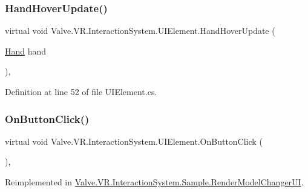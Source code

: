 \mbox{\label{class_valve_1_1_v_r_1_1_interaction_system_1_1_u_i_element_a025a3608cf51eb78b4db7db6f81b7bab}} 
\subsubsection{\texorpdfstring{HandHoverUpdate()}{HandHoverUpdate()}}
{\footnotesize\ttfamily virtual void Valve.\+V\+R.\+Interaction\+System.\+U\+I\+Element.\+Hand\+Hover\+Update (\begin{DoxyParamCaption}\item[{\mbox{\hyperlink{class_valve_1_1_v_r_1_1_interaction_system_1_1_hand}{Hand}}}]{hand }\end{DoxyParamCaption})\hspace{0.3cm}{\ttfamily [protected]}, {\ttfamily [virtual]}}



Definition at line 52 of file U\+I\+Element.\+cs.

\mbox{\label{class_valve_1_1_v_r_1_1_interaction_system_1_1_u_i_element_af4aa0f9d62309d5299ed208c524da1d1}} 
\subsubsection{\texorpdfstring{OnButtonClick()}{OnButtonClick()}}
{\footnotesize\ttfamily virtual void Valve.\+V\+R.\+Interaction\+System.\+U\+I\+Element.\+On\+Button\+Click (\begin{DoxyParamCaption}{ }\end{DoxyParamCaption})\hspace{0.3cm}{\ttfamily [protected]}, {\ttfamily [virtual]}}



Reimplemented in \mbox{\hyperlink{class_valve_1_1_v_r_1_1_interaction_system_1_1_sample_1_1_render_model_changer_u_i_a8b1eff8a1a58fca51ee9a963bff8b7f5}{Valve.\+V\+R.\+Interaction\+System.\+Sample.\+Render\+Model\+Changer\+UI}}.



